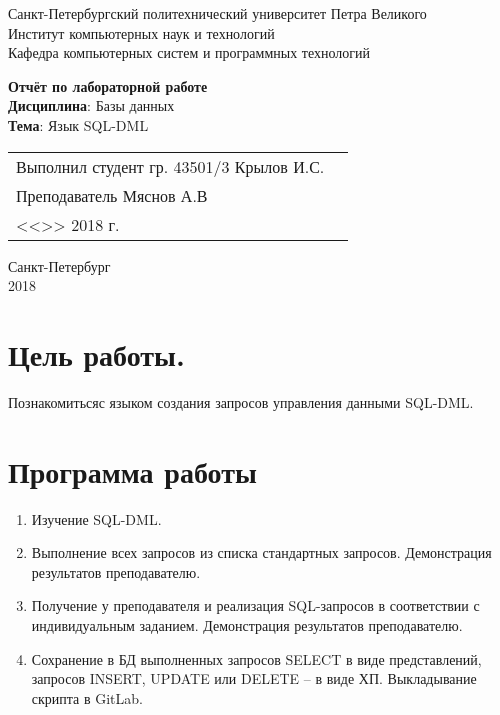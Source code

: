 \documentclass[a4paper,14pt]{extarticle}
\begin{document}
\begin{titlepage}
\centering
Санкт-Петербургский политехнический университет Петра Великого \\
Институт компьютерных наук и технологий \\
Кафедра компьютерных систем и программных технологий \\
\vspace{5.5cm}

{\centering \textbf{Отчёт по лабораторной работе} \\ 
\vspace{0.15cm}
\textbf{Дисциплина}: Базы данных \\
\vspace{0.15cm}
\textbf{Тема}: Язык SQL-DML} \\

\vspace{5.5cm}

\begin{table}[H]
\begin{tabular}{p{\textwidth}@{}r}
{Выполнил студент гр. 43501/3} \hfill 
\vspace{0.2cm}
Крылов И.С. \\ \hfill
\vspace{0.2cm}

Преподаватель \hfill 
\vspace{0.2cm}
Мяснов А.В \\ \hfill 
\vspace{0.2cm}

{} \hfill { <<\underline{\hspace{0.08\textwidth}}>> \underline{\hspace{0.2\textwidth}}2018 г.} \\
\end{tabular}
\end{table}
\vfill
{\centering Санкт-Петербург \\ 
\vspace{0.15cm}
2018}
\end{titlepage}

\section{Цель работы.}
Познакомитьсяс языком создания запросов управления данными SQL-DML.

\section{Программа работы}
\begin{enumerate}
\item Изучение SQL-DML.
\item Выполнение всех запросов из списка стандартных запросов. Демонстрация результатов преподавателю.
\item Получение у преподавателя и реализация SQL-запросов в соответствии с индивидуальным заданием. Демонстрация результатов преподавателю.
\item Сохранение в БД выполненных запросов SELECT в виде представлений, запросов INSERT, UPDATE или DELETE -- в виде ХП. Выкладывание скрипта в GitLab.
\end{enumerate}
\end{document}
